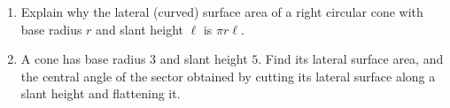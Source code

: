 \begin{enumerate}
\item[(a)] Explain why the lateral (curved) surface area of a right circular cone with base radius $r$ and slant height $\ell$ is $\pi r\ell$.
\item[(b)] A cone has base radius $3$ and slant height $5$. Find its lateral surface area, and the central angle of the sector obtained by cutting its lateral surface along a slant height and flattening it.
\end{enumerate}
